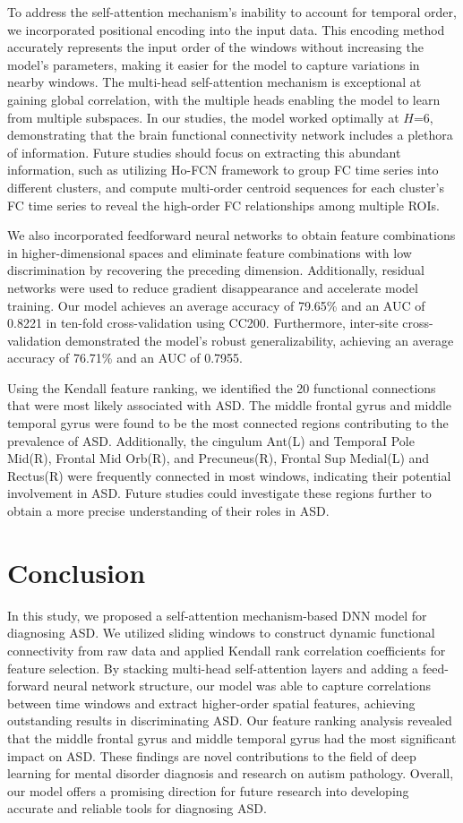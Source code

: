 \documentclass[journal,twoside,web]{ieeecolor}
\begin{document}
To address the self-attention mechanism's inability to account for temporal order, we incorporated positional encoding into the input data. This encoding method accurately represents the input order of the windows without increasing the model's parameters, making it easier for the model to capture variations in nearby windows. The multi-head self-attention mechanism is exceptional at gaining global correlation, with the multiple heads enabling the model to learn from multiple subspaces. In our studies, the model worked optimally at $H$=6, demonstrating that the brain functional connectivity network includes a plethora of information. Future studies should focus on extracting this abundant information, such as utilizing Ho-FCN framework to group FC time series into different clusters, and compute multi-order centroid sequences for each cluster's FC time series to reveal the high-order FC relationships among multiple ROIs\cite{zhao2021constructing}.

We also incorporated feedforward neural networks to obtain feature combinations in higher-dimensional spaces and eliminate feature combinations with low discrimination by recovering the preceding dimension. Additionally, residual networks were used to reduce gradient disappearance and accelerate model training. Our model achieves an average accuracy of 79.65\% and an AUC of 0.8221 in ten-fold cross-validation using CC200. Furthermore, inter-site cross-validation demonstrated the model's robust generalizability, achieving an average accuracy of 76.71\% and an AUC of 0.7955. 

Using the Kendall feature ranking, we identified the 20 functional connections that were most likely associated with ASD. The middle frontal gyrus and middle temporal gyrus were found to be the most connected regions contributing to the prevalence of ASD. Additionally, the cingulum Ant(L) and TemporaI Pole Mid(R), Frontal Mid Orb(R), and Precuneus(R), Frontal Sup Medial(L) and Rectus(R) were frequently connected  in most windows, indicating their potential involvement in ASD. Future studies could investigate these regions further to obtain a more precise understanding of their roles in ASD.
\section{Conclusion}
In this study, we proposed a self-attention mechanism-based DNN model for diagnosing ASD. We utilized sliding windows to construct dynamic functional connectivity from raw data and applied Kendall rank correlation coefficients for feature selection. By stacking multi-head self-attention layers and adding a feed-forward neural network structure, our model was able to capture correlations between time windows and extract higher-order spatial features, achieving outstanding results in discriminating ASD. Our feature ranking analysis revealed that the middle frontal gyrus and middle temporal gyrus had the most significant impact on ASD.  These findings are novel contributions to the field of deep learning for mental disorder diagnosis and research on autism pathology. Overall, our model offers a promising direction for future research into developing accurate and reliable tools for diagnosing ASD.


{}
\end{document}
